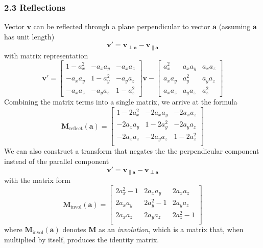 \documentclass[11pt]{article}
\newcommand{\bm}[1]{\mathbf{#1}}
\DeclareMathOperator{\reflect}{reflect}
\DeclareMathOperator{\invol}{invol}
\begin{document}
\subsubsection*{2.3 Reflections}
Vector $\bm{v}$ can be reflected through a plane perpendicular to vector $\bm{a}$ (assuming $\bm{a}$ has unit length)
\begin{equation}
    \bm{v}' = \bm{v}_{\perp \bm{a}} - \bm{v}_{\parallel \bm{a}}
\end{equation}
with matrix representation
\begin{equation}
    \bm{v}' = \begin{bmatrix}
        1 - a_x^2 & -a_xa_y & -a_xa_z \\
        -a_xa_y & 1 - a_y^2 & -a_ya_z \\
        -a_xa_z & -a_ya_z & 1-a_z^2
    \end{bmatrix} \bm{v} - \begin{bmatrix}
        a_x^2 & a_xa_y & a_xa_z \\
        a_xa_y & a_y^2 & a_ya_z \\
        a_xa_z & a_ya_z & a_z^2
    \end{bmatrix}
\end{equation}
Combining the matrix terms into a single matrix, we arrive at the formula
\begin{equation}
    \bm{M}_{\reflect}\left(\bm{a}\right) = \begin{bmatrix}
        1 - 2a_x^2 & -2a_xa_y & -2a_xa_z \\
        -2a_xa_y & 1 - 2a_y^2 & -2a_ya_z \\
        -2a_xa_z & -2a_ya_z & 1 - 2a_z^2 \\
    \end{bmatrix}
\end{equation}
We can also construct a transform that negates the the perpendicular component instead of the
parallel component
\begin{equation}
    \bm{v}' = \bm{v}_{\parallel \bm{a}} - \bm{v}_{\perp \bm{a}}
\end{equation}
with the matrix form
\begin{equation}
    \bm{M}_{\invol}\left(\bm{a}\right) = \begin{bmatrix}
        2a_x^2 - 1 & 2a_xa_y & 2a_xa_z \\
        2a_xa_y & 2a_y^2 - 1 & 2a_ya_z \\
        2a_xa_z & 2a_ya_z & 2a_z^2 - 1 \\
    \end{bmatrix}
\end{equation}
where $\bm{M}_{\invol} \left(\bm{a}\right)$ denotes $\bm{M}$ as an \textit{involution}, which is a
matrix that, when multiplied by itself, produces the identity matrix.
\end{document}
